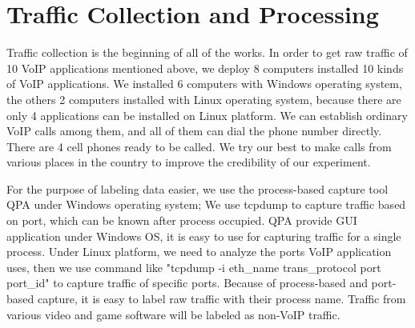 \documentclass[conference]{IEEEtran}
\begin{document}

\section{Traffic Collection and Processing}
\label{sec:trafficcollectionandprocessing}
Traffic collection is the beginning of all of the works. In order to get raw traffic of 10 VoIP applications mentioned above, we deploy 8 computers installed 10 kinds of VoIP applications. We installed 6 computers with Windows operating system, the others 2 computers installed with Linux operating system, because there are only 4 applications can be installed on Linux platform. We can establish ordinary VoIP calls among them, and all of them can dial the phone number directly. There are 4 cell phones ready to be called. We try our best to make calls from various places in the country to improve the credibility of our experiment.



For the purpose of labeling data easier, we use the process-based capture tool QPA under Windows operating system; We use tcpdump to capture traffic based on port, which can be known after process occupied. QPA provide GUI application under Windows OS, it is easy to use for capturing traffic for a single process. Under Linux platform, we need to analyze the ports VoIP
application uses, then we use command like "tcpdump -i eth\_name trans\_protocol port port_id" to capture traffic of specific ports. Because of process-based and port-based capture, it is easy to label raw traffic with their process name. Traffic from various video and game software will be labeled as non-VoIP traffic.
\end{document}
